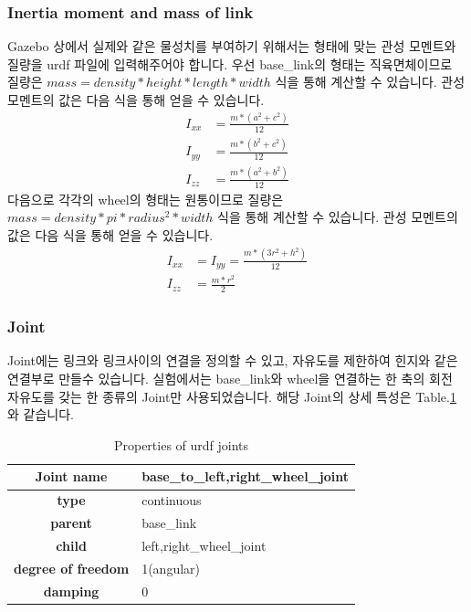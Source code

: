 \documentclass{article}
\begin{document}
			\subsubsection{Inertia moment and mass of link}
			Gazebo 상에서 실제와 같은 물성치를 부여하기 위해서는 형태에 맞는 관성 모멘트와 질량을 urdf 파일에 입력해주어야 합니다.
			우선 base\_link의 형태는 직육면체이므로 질량은 $mass=density*height*length*width$ 식을 통해 계산할 수 있습니다. 관성 모멘트의 값은 다음 식을 통해 얻을 수 있습니다.
			\begin{align}
			I_{xx} & =\frac{m*(a^2 + c^2)}{12} \\ 
			I_{yy} & =\frac{m*(b^2 + c^2)}{12} \\
			I_{zz} & =\frac{m*(a^2 + b^2)}{12} 
			\end{align}
			다음으로 각각의 wheel의 형태는 원통이므로 질량은 $mass=density*pi*radius^2*width$ 식을 통해 계산할 수 있습니다. 관성 모멘트의 값은 다음 식을 통해 얻을 수 있습니다.
			\begin{align}
			I_{xx} & = I_{yy} = \frac{m*(3r^2 + h^2)}{12} \\ 
			I_{zz} & =\frac{m*r^2}{2} 
			\end{align}
			
			
			\subsubsection{Joint}
			 Joint에는 링크와 링크사이의 연결을 정의할 수 있고, 자유도를 제한하여 힌지와 같은 연결부로 만들수 있습니다. 실험에서는 base\_link와 wheel을 연결하는 한 축의 회전 자유도를 갖는 한 종류의 Joint만 사용되었습니다. 해당 Joint의 상세 특성은 Table.\ref{table:urdf_joint}와 같습니다.
			 
			\begin{table}[h]
			\centering
			\caption{Properties of urdf joints}
			\begin{tabular}{c|l}
			\textbf{Joint name} & base\_to\_left,right\_wheel\_joint \\
			\hline
			\textbf{type} & continuous \\
			\hline
			\textbf{parent} & base\_link \\
			\hline
			\textbf{child} & left,right\_wheel\_joint \\
			\hline
			\textbf{degree of freedom} & 1(angular) \\
			\hline
			\textbf{damping} & 0\\
			\end{tabular}
			\label{table:urdf_joint}
			\end{table}
			
\end{document}
